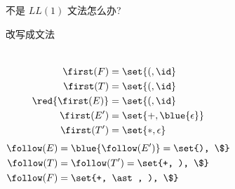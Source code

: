 
\begin{frame}{}
  \begin{center}
    不是 $LL(1)$ 文法怎么办?

    \pause
    \vspace{0.60cm}

    \pause
    \vspace{0.80cm}

    \vspace{0.30cm}
  \end{center}
\end{frame}

\begin{frame}{}
  \begin{center}
    
    

  \end{center}
\end{frame}

\begin{frame}{}
  \begin{center}
    改写成文法
    \begin{columns}
        
    \end{columns}

    \vspace{-0.30cm}
    \begin{columns}
        \pause
        \begin{align*}
          \first(F) &= \set{(, \id} \\
          \first(T) &= \set{(, \id} \\
          \red{\first(E)} &= \set{(, \id} \\
          \first(E') &= \set{+, \blue{\epsilon}} \\
          \first(T') &= \set{\ast, \epsilon}
        \end{align*}
        \begin{align*}
          \follow(E) &= \blue{\follow(E')} = \set{), \$} \\
          \follow(T) &= \follow(T') = \set{+, ), \$} \\
          \follow(F) &= \set{+, \ast, ), \$}
        \end{align*}
    \end{columns}
  \end{center}
\end{frame}

